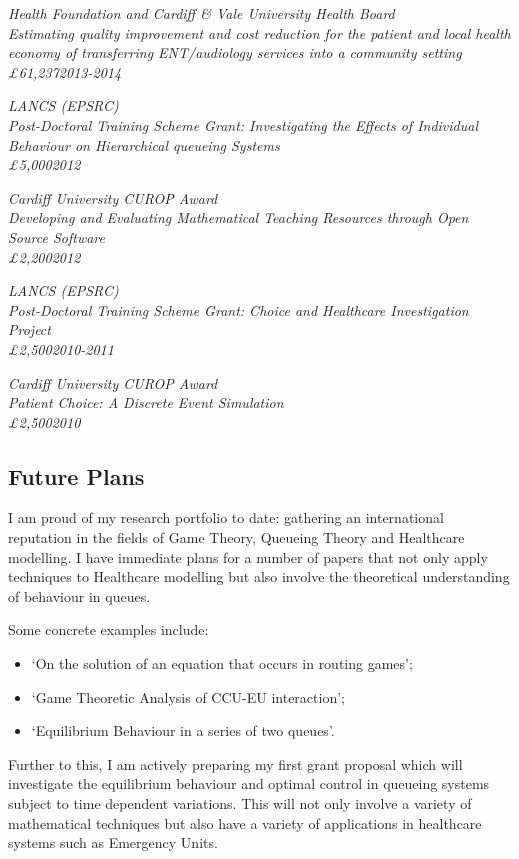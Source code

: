 \documentclass{article}
\begin{document}
\sl{Health Foundation and Cardiff \& Vale University Health Board}\\
Estimating quality improvement and cost reduction for the patient and local health economy of transferring ENT/audiology services into a community setting\\
\pounds61,237\hfill{2013-2014}


\sl{LANCS (EPSRC)}\\
Post-Doctoral Training Scheme Grant: Investigating the Effects of Individual Behaviour on Hierarchical queueing Systems\\
\pounds5,000\hfill{2012}


\sl{Cardiff University CUROP Award}\\
Developing and Evaluating Mathematical Teaching Resources through Open Source Software\\
\pounds2,200\hfill{2012}

\sl{LANCS (EPSRC)}\\
Post-Doctoral Training Scheme Grant: Choice and Healthcare Investigation Project\\
\pounds2,500\hfill{2010-2011}

\sl{Cardiff University CUROP Award}\\
Patient Choice: A Discrete Event Simulation\\
\pounds2,500\hfill{2010}

\subsection{Future Plans}

I am proud of my research portfolio to date: gathering an international reputation in the fields of Game Theory, Queueing Theory and Healthcare modelling.
I have immediate plans for a number of papers that not only apply techniques to Healthcare modelling but also involve the theoretical understanding of behaviour in queues.

Some concrete examples include:

\begin{itemize}
    \item `On the solution of an equation that occurs in routing games';
    \item `Game Theoretic Analysis of CCU-EU interaction';
    \item `Equilibrium Behaviour in a series of two queues'.
\end{itemize}

Further to this, I am actively preparing my first grant proposal which will investigate the equilibrium behaviour and optimal control in queueing systems subject to time dependent variations.
This will not only involve a variety of mathematical techniques but also have a variety of applications in healthcare systems such as Emergency Units.
\end{document}
